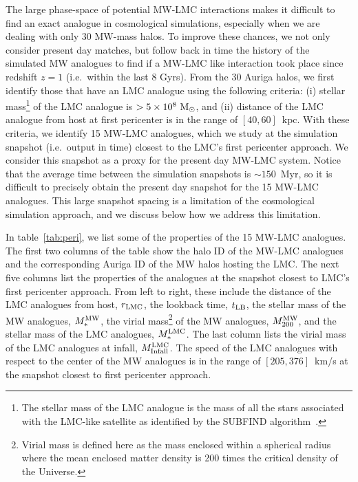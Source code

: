 The large phase-space of potential MW-LMC interactions makes it difficult to find an exact analogue in cosmological simulations, especially when we are dealing with only 30 MW-mass halos. To improve these chances, we not only consider present day matches, but follow back in time the history of the simulated MW analogues to find if a MW-LMC like interaction took place since redshift $z=1$ (i.e.~within the last 8 Gyrs). 
From the 30 Auriga halos, we first identify those that have an LMC analogue using the following criteria: (i) stellar mass\footnote{The stellar mass of the LMC analogue is the mass of all the stars associated with the LMC-like satellite as identified by the SUBFIND algorithm~\cite{Springel:2000qu}.} of the LMC analogue is $>5 \times 10^8~{\rm M}_\odot$, and (ii) distance of the LMC analogue from host at first pericenter is in the range of $[40, 60]$~kpc. With these criteria, we identify 15 MW-LMC analogues, which we study at the simulation snapshot (i.e.~output in time) closest to the LMC's first pericenter approach. We consider this snapshot as a proxy for the present day MW-LMC system. Notice that the average time between the simulation snapshots is $\sim 150$~Myr, so it is difficult to precisely obtain the present day snapshot for the 15 MW-LMC analogues. This large snapshot spacing is a limitation of the cosmological simulation approach, and we discuss below how we address this limitation.


In table~\ref{tab:peri}, we list some of the properties of the 15 MW-LMC analogues. The first two columns of the table show the halo ID of the MW-LMC analogues and the corresponding Auriga ID of the MW halos hosting the LMC. The next five columns list the properties of the analogues at the snapshot closest to LMC's first pericenter approach. From left to right, these include the distance of the LMC analogues from host, $r_{\rm LMC}$, the lookback time, $t_{\rm LB}$, the stellar mass of the MW  analogues, $M_{\ast}^{\rm MW}$, the virial mass\footnote{Virial mass is defined here as the mass enclosed within a spherical radius where the mean enclosed matter density is 200 times the critical density of the Universe.}  of the MW analogues, $M_{200}^{\rm MW}$, and the stellar mass of the LMC analogues, $M_{\ast}^{\rm LMC}$. The last column  lists the virial mass of the LMC analogues at infall, $M_{\rm Infall}^{\rm LMC}$. The speed of the LMC analogues with respect to the center of the MW analogues is in the range of $[205, 376]$~km/s at the snapshot closest to first pericenter approach.

